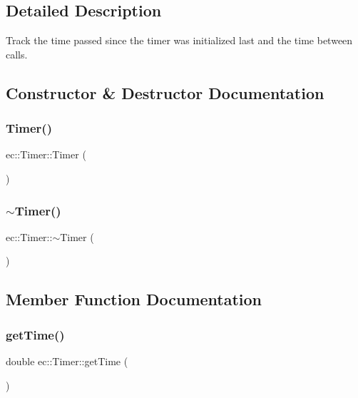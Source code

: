 \subsection{Detailed Description}
Track the time passed since the timer was initialized last and the time between calls. 

\subsection{Constructor \& Destructor Documentation}
\mbox{\label{classec_1_1_timer_afa10f411221610c507291183b6b6aa56}} 
\subsubsection{\texorpdfstring{Timer()}{Timer()}}
{\footnotesize\ttfamily ec\+::\+Timer\+::\+Timer (\begin{DoxyParamCaption}{ }\end{DoxyParamCaption})\hspace{0.3cm}{\ttfamily [explicit]}}

\mbox{\label{classec_1_1_timer_a496dc6127f9d0c8ec3dc8d91de6b6448}} 
\subsubsection{\texorpdfstring{$\sim$\+Timer()}{~Timer()}}
{\footnotesize\ttfamily ec\+::\+Timer\+::$\sim$\+Timer (\begin{DoxyParamCaption}{ }\end{DoxyParamCaption})\hspace{0.3cm}{\ttfamily [default]}}



\subsection{Member Function Documentation}
\mbox{\label{classec_1_1_timer_afdd04188d609cf55b9546d32a89f52dc}} 
\subsubsection{\texorpdfstring{get\+Time()}{getTime()}}
{\footnotesize\ttfamily double ec\+::\+Timer\+::get\+Time (\begin{DoxyParamCaption}{ }\end{DoxyParamCaption})\hspace{0.3cm}{\ttfamily [static]}}

